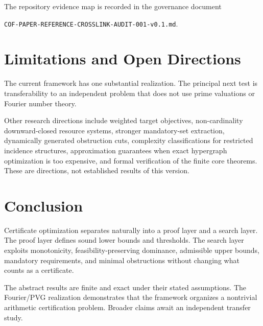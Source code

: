 \documentclass[11pt]{article}
\theoremstyle{definition}
\theoremstyle{remark}
\begin{document}
The repository evidence map is recorded in the governance document
\begin{center}
\texttt{COF-PAPER-REFERENCE-CROSSLINK-AUDIT-001-v0.1.md}.
\end{center}

\section{Limitations and Open Directions}

The current framework has one substantial realization. The principal next test is transferability to an independent problem that does not use prime valuations or Fourier number theory.

Other research directions include weighted target objectives, non-cardinality downward-closed resource systems, stronger mandatory-set extraction, dynamically generated obstruction cuts, complexity classifications for restricted incidence structures, approximation guarantees when exact hypergraph optimization is too expensive, and formal verification of the finite core theorems. These are directions, not established results of this version.

\section{Conclusion}

Certificate optimization separates naturally into a proof layer and a search layer. The proof layer defines sound lower bounds and thresholds. The search layer exploits monotonicity, feasibility-preserving dominance, admissible upper bounds, mandatory requirements, and minimal obstructions without changing what counts as a certificate.

The abstract results are finite and exact under their stated assumptions. The Fourier/PVG realization demonstrates that the framework organizes a nontrivial arithmetic certification problem. Broader claims await an independent transfer study.

\end{document}
